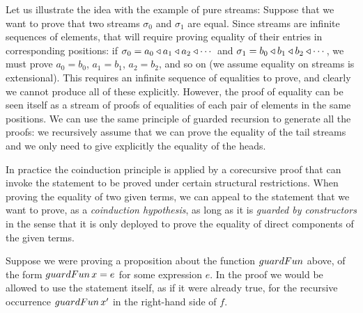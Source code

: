 Let us illustrate the idea with the example of pure streams:
Suppose that we want to prove that two streams $\sigma_0$ and $\sigma_1$ are equal.
Since streams are infinite sequences of elements, that will require proving equality of their entries in corresponding positions: if $\sigma_0 = a_0\triangleleft a_1\triangleleft a_2\triangleleft \cdots$ and  $\sigma_1 = b_0\triangleleft b_1\triangleleft b_2\triangleleft \cdots$, we must prove $a_0 = b_0$, $a_1 = b_1$, $a_2=b_2$, and so on (we assume equality on streams is extensional).
This requires an infinite sequence of equalities to prove, and clearly we cannot produce all of these explicitly.
However, the proof of equality can be seen itself as a stream of proofs of equalities of each pair of elements in the same positions.
We can use the same principle of guarded recursion to generate all the proofs: we recursively assume that we can prove the equality of the tail streams and we only need to give explicitly the equality of the heads.

In practice the coinduction principle is applied by a corecursive proof that can invoke the statement to be proved under certain structural restrictions.
When proving the equality of two given terms, we can appeal to the statement that we want to prove, as a {\em coinduction hypothesis}, as long as it is {\em guarded by constructors} in the sense that it is only deployed to prove the equality of direct components of the given terms.

Suppose we were proving a proposition about the function $\guardf$ above, of the form $\guardf\,x = e$ for some expression $e$.
In the proof we would be allowed to use the statement itself, as if it were already true, for the recursive occurrence $\guardf\,x'$ in the right-hand side of $f$.

